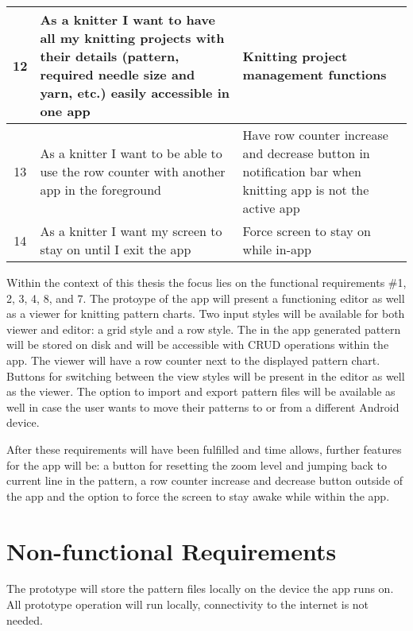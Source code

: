 \begin{longtable}{| c | p{6.5cm} | p{6.5cm} |}
	12 & As a knitter I want to have all my knitting projects with their details (pattern, required needle size and yarn, etc.) easily accessible in one app & Knitting project management functions  \\ \hline
	13 & As a knitter I want to be able to use the row counter with another app in the foreground &  Have row counter increase and decrease button in notification bar when knitting app is not the active app \\ \hline
	14 & As a knitter I want my screen to stay on until I exit the app & Force screen to stay on while in-app \\ \hline
\end{longtable}

Within the context of this thesis the focus lies on the functional requirements \#1, 2, 3, 4, 8, and 7. The protoype of the app will present a functioning editor as well as a viewer for knitting pattern charts. Two input styles will be available for both viewer and editor: a grid style and a row style. The in the app generated pattern will be stored on disk and will be accessible with CRUD operations within the app. The viewer will have a row counter next to the displayed pattern chart. Buttons for switching between the view styles will be present in the editor as well as the viewer. The option to import and export pattern files will be available as well in case the user wants to move their patterns to or from a different Android device. 

After these requirements will have been fulfilled and time allows, further features for the app will be: a button for resetting the zoom level and jumping back to current line in the pattern, a row counter increase and decrease button outside of the app and the option to force the screen to stay awake while within the app.

\section{Non-functional Requirements}

The prototype will store the pattern files locally on the device the app runs on. All prototype operation will run locally, connectivity to the internet is not needed. 